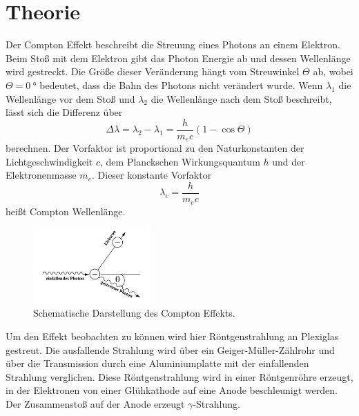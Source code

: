 \section{Theorie}
\label{sec:Theorie}




Der Compton Effekt beschreibt die Streuung eines Photons an einem Elektron.
Beim Stoß mit dem Elektron gibt das Photon Energie ab und dessen Wellenlänge wird gestreckt.
Die Größe dieser Veränderung hängt vom Streuwinkel $\Theta$ ab, wobei $\Theta=\SI{0}{\degree}$ bedeutet, dass die Bahn des Photons nicht verändert wurde.
Wenn $\lambda_1$ die Wellenlänge vor dem Stoß und $\lambda_2$ die Wellenlänge nach dem Stoß beschreibt, lässt sich die Differenz über
\begin{equation}
    \Delta \lambda = \lambda_2 - \lambda_1 = \frac{h}{m_e c}(1-\cos \Theta)
    \label{eq:differenz}
\end{equation}
berechnen.
Der Vorfaktor ist proportional zu den Naturkonstanten der Lichtgeschwindigkeit $c$, dem Planckschen Wirkungsquantum $h$ und der Elektronenmasse $m_e$.
Dieser konstante Vorfaktor 
\begin{equation}
    \lambda_c = \frac{h}{m_e c}
    \label{eq:compton-wellenlänge}
\end{equation}
heißt Compton Wellenlänge.

\begin{figure}
    \centering
    \includegraphics[width=0.4\textwidth]{images/bild_1.png}
    \caption{Schematische Darstellung des Compton Effekts.\cite{V603}}
    \label{fig:compton}
\end{figure}

Um den Effekt beobachten zu können wird hier Röntgenstrahlung an Plexiglas gestreut. 
Die ausfallende Strahlung wird über ein Geiger-Müller-Zählrohr und über die Transmission durch eine Aluminiumplatte mit der einfallenden Strahlung verglichen.
Diese Röntgenstrahlung wird in einer Röntgenröhre erzeugt, in der Elektronen von einer Glühkathode auf eine Anode beschleunigt werden. 
Der Zusammenstoß auf der Anode erzeugt $\gamma$-Strahlung.

